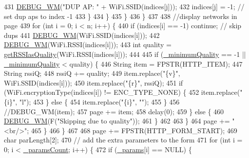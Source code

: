 \begin{DoxyCode}
431               \hyperlink{class_wi_fi_manager_ae5f595c670ccbcf9a191baf50f5c7c26}{DEBUG\_WM}(\textcolor{stringliteral}{"DUP AP: "} + WiFi.SSID(indices[j]));
432               indices[j] = -1; \textcolor{comment}{// set dup aps to index -1}
433             \}
434           \}
435         \}
436       \}
437 
438       \textcolor{comment}{//display networks in page}
439       \textcolor{keywordflow}{for} (\textcolor{keywordtype}{int} i = 0; i < n; i++) \{
440         \textcolor{keywordflow}{if} (indices[i] == -1) \textcolor{keywordflow}{continue}; \textcolor{comment}{// skip dups}
441         \hyperlink{class_wi_fi_manager_ae5f595c670ccbcf9a191baf50f5c7c26}{DEBUG\_WM}(WiFi.SSID(indices[i]));
442         \hyperlink{class_wi_fi_manager_ae5f595c670ccbcf9a191baf50f5c7c26}{DEBUG\_WM}(WiFi.RSSI(indices[i]));
443         \textcolor{keywordtype}{int} quality = \hyperlink{class_wi_fi_manager_ae71cfd6bd70ada2ca02e1d20b152d0e5}{getRSSIasQuality}(WiFi.RSSI(indices[i]));
444 
445         \textcolor{keywordflow}{if} (\hyperlink{class_wi_fi_manager_ad1e130a5ce502767de764ea0cb1cecf6}{\_minimumQuality} == -1 || \hyperlink{class_wi_fi_manager_ad1e130a5ce502767de764ea0cb1cecf6}{\_minimumQuality} < quality) \{
446           String item = FPSTR(HTTP\_ITEM);
447           String rssiQ;
448           rssiQ += quality;
449           item.replace(\textcolor{stringliteral}{"\{v\}"}, WiFi.SSID(indices[i]));
450           item.replace(\textcolor{stringliteral}{"\{r\}"}, rssiQ);
451           \textcolor{keywordflow}{if} (WiFi.encryptionType(indices[i]) != ENC\_TYPE\_NONE) \{
452             item.replace(\textcolor{stringliteral}{"\{i\}"}, \textcolor{stringliteral}{"l"});
453           \} \textcolor{keywordflow}{else} \{
454             item.replace(\textcolor{stringliteral}{"\{i\}"}, \textcolor{stringliteral}{""});
455           \}
456           \textcolor{comment}{//DEBUG\_WM(item);}
457           page += item;
458           delay(0);
459         \} \textcolor{keywordflow}{else} \{
460           \hyperlink{class_wi_fi_manager_ae5f595c670ccbcf9a191baf50f5c7c26}{DEBUG\_WM}(F(\textcolor{stringliteral}{"Skipping due to quality"}));
461         \}
462 
463       \}
464       page += \textcolor{stringliteral}{"<br/>"};
465     \}
466   \}
467 
468   page += FPSTR(HTTP\_FORM\_START);
469   \textcolor{keywordtype}{char} parLength[2];
470   \textcolor{comment}{// add the extra parameters to the form}
471   \textcolor{keywordflow}{for} (\textcolor{keywordtype}{int} i = 0; i < \hyperlink{class_wi_fi_manager_a22e803d23ae77cb611914445db17c9b6}{\_paramsCount}; i++) \{
472     \textcolor{keywordflow}{if} (\hyperlink{class_wi_fi_manager_a355ce9bbaab94baffd1c83de9b166fea}{\_params}[i] == NULL) \{

\end{DoxyCode}
